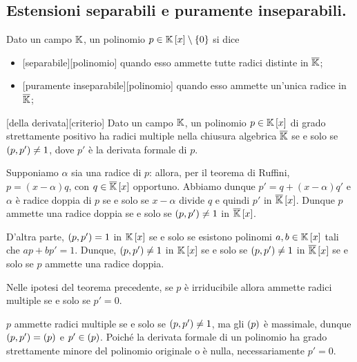 \subsection{Estensioni separabili e puramente inseparabili.}\label{EstensioniSeparabiliEPuramenteInseparabili}
\begin{Definition}
	Dato un campo $\mathbb{K}$, un polinomio $p \in \mathbb{K} \left [ x \right ] \setminus \lbrace 0 \rbrace$ si dice
	\begin{itemize}
		\item {}[separabile][polinomio] quando esso ammette tutte radici distinte in $\overline{\mathbb{K}}$;
		\item {}[puramente inseparabile][polinomio] quando esso ammette un'unica radice in $\overline{\mathbb{K}}$;
	\end{itemize}
\end{Definition}
\begin{Theorem}
	[della derivata][criterio] Dato un campo $\mathbb{K}$, un polinomio $p \in \mathbb{K} \left [ x \right ]$ di grado strettamente positivo ha radici multiple nella chiusura algebrica $\overline{\mathbb{K}}$ se e solo se $\left ( p,p' \right ) \neq 1$, dove $p'$ \`e la derivata formale di $p$.
\end{Theorem}
\Proof Supponiamo $\alpha$ sia una radice di $p$: allora, per il teorema di Ruffini, $p = (x - \alpha)q$, con $q \in \overline{\mathbb{K}} \left [ x \right ]$ opportuno. Abbiamo dunque $p' = q + (x - \alpha)q'$ e $\alpha$ \`e radice doppia di $p$ se e solo se $x - \alpha$ divide $q$ e quindi $p'$ in $\overline{\mathbb{K}} \left [ x \right ]$. Dunque $p$ ammette una radice doppia se e solo se $\left ( p,p' \right ) \neq 1$ in $\overline{\mathbb{K}} \left [ x \right ]$.
\par D'altra parte, $\left ( p,p' \right ) = 1$ in $\mathbb{K} \left [ x \right ]$ se e solo se esistono polinomi $a, b \in \mathbb{K} \left [ x \right ]$ tali che $ap + bp' = 1$. Dunque, $\left ( p,p' \right ) \neq 1$ in $\mathbb{K} \left [ x \right ]$ se e solo se $\left ( p,p' \right ) \neq 1$ in $\overline{\mathbb{K}} \left [ x \right ]$ se e solo se $p$ ammette una radice doppia. \EndProof
\begin{Corollary}
	Nelle ipotesi del teorema precedente, se $p$ \`e irriducibile allora ammette radici multiple se e solo se $p' = 0$.
\end{Corollary}
\Proof $p$ ammette radici multiple se e solo se $\left ( p,p' \right ) \neq 1$, ma gli $\left ( p \right )$ \`e massimale, dunque $\left ( p,p' \right ) = \left ( p \right )$ e $p' \in \left ( p \right )$. Poich\'e la derivata formale di un polinomio ha grado strettamente minore del polinomio originale o \`e nulla, necessariamente $p' = 0$. \EndProof
